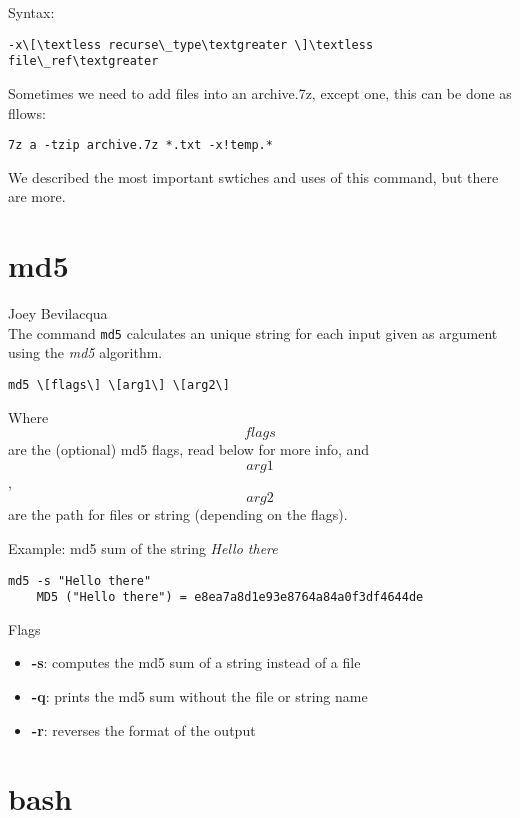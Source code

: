 \documentclass[hidelinks,12pt,a4paper,numbers=enddot]{scrartcl}
\begin{document}
Syntax:

\begin{verbatim}
-x\[\textless recurse\_type\textgreater \]\textless file\_ref\textgreater 
\end{verbatim}

Sometimes we need to add files into an archive.7z, except one, this can be done as fllows:

\begin{verbatim}
7z a -tzip archive.7z *.txt -x!temp.*
\end{verbatim}


We described the most important swtiches and uses of this command, but there are more.

\section{md5}


\large Joey Bevilacqua \normalsize\\



The command \texttt{md5} calculates an unique string for each input given as
argument using the \emph{md5} algorithm.

\begin{verbatim}
md5 \[flags\] \[arg1\] \[arg2\]
\end{verbatim}

Where \[flags\] are the (optional) md5 flags, read below for more info,
and \[arg1\], \[arg2\] are the path for files or string (depending on the flags).

Example: md5 sum of the string \emph{Hello there}

\begin{verbatim}
md5 -s "Hello there"
    MD5 ("Hello there") = e8ea7a8d1e93e8764a84a0f3df4644de
\end{verbatim}

Flags

\begin{itemize}
    \item \textbf{-s}: computes the md5 sum of a string instead of a file
    \item \textbf{-q}: prints the md5 sum without the file or string name
    \item \textbf{-r}: reverses the format of the output
\end{itemize}

\section{bash}
\end{document}
